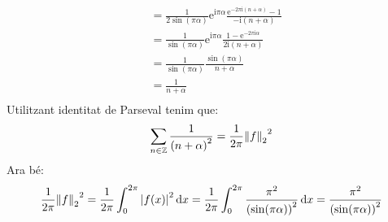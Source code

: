 \documentclass[10pt,a4paper]{article}
\newcommand{\ZZ}{\ensuremath{\mathbb{Z}}} %
\newcommand{\ii}{\mathrm{i}} %
\theoremstyle{definition}
\renewcommand{\exp}[1]{\mathrm{e}^{#1}} %
\begin{document}
\begin{enumerate}
\begin{align*}
                         & =\frac{1}{2\sin(\pi\alpha)}\exp{\ii\pi\alpha}\frac{\exp{-2\pi\ii(n+\alpha)}-1}{-\ii(n+\alpha)}       \\
                         & =\frac{1}{\sin(\pi\alpha)}\exp{\ii\pi\alpha}\frac{1-\exp{-2\pi\ii\alpha}}{2\ii(n+\alpha)}            \\
                         & =\frac{1}{\sin(\pi\alpha)}\frac{\sin(\pi\alpha)}{n+\alpha}                                           \\
                         & =\frac{1}{n+\alpha}                                                                                  \\
        \end{align*}
        Utilitzant identitat de Parseval tenim que:
        $$\sum_{n\in\ZZ}\frac{1}{{(n+\alpha)}^2}=\frac{1}{2\pi}{\norm{f}_2}^2$$
        Ara bé: $$\frac{1}{2\pi}{\norm{f}_2}^2=\frac{1}{2\pi}\int_0^{2\pi}\abs{f(x)}^2\dd{x}=\frac{1}{2\pi}\int_0^{2\pi}\frac{\pi^2}{{(\sin(\pi\alpha))}^2}\dd{x}=\frac{\pi^2}{{(\sin(\pi\alpha))}^2}$$
\end{enumerate}
\end{document}
